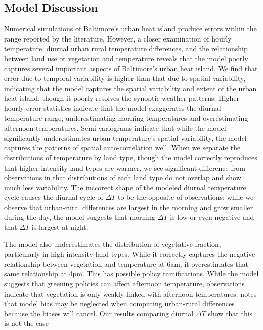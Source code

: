 \documentclass[draft,linenumbers]{agujournal}
\begin{document}
\subsection{Model Discussion}
Numerical simulations of Baltimore's urban heat island produce errors within the range reported by the literature. However, a closer examination of hourly temperature, diurnal urban rural temperature differences, and the relationship between land use or vegetation and temperature reveals that the model poorly captures several important aspects of Baltimore's urban heat island. 
We find that error due to temporal variability is higher than that due to spatial variability, indicating that the model captures the spatial variability and extent of the urban heat island, though it poorly resolves the synoptic weather patterns. Higher hourly error statistics indicate that the model exaggerates the diurnal temperature range, underestimating morning temperatures and overestimating afternoon temperatures. 
 Semi-variograms indicate that while the model significantly underestimates urban temperature's spatial variability, the model captures the patterns of spatial auto-correlation well. When we separate the distributions of temperature by land type, though the model correctly reproduces that higher intensity land types are warmer, we see significant difference from observations in that distributions of each land type do not overlap and show much less variability. 
 The  inccorect shape of the modeled diurnal temperature cycle causes the diurnal cycle of $\Delta T$ to be the opposite of observations: while we observe that urban-rural differences are largest in the morning and grow smaller during the day, the model suggests that morning $\Delta T$ is low or even negative and that $\Delta T$ is largest at night. 

The model also underestimates the distribution of vegetative fraction, particularly in high intensity land types. While it correctly captures the negative relationship between vegetation and temperature at 6am, it overestimates that same relationship at 4pm. This has possible policy ramifications. While the model suggests that greening policies can affect afternoon temperature, observations indicate that vegetation is only weakly linked with afternoon temperatures.
% 
\cite{lisynergistic2003} notes that model bias may be neglected when computing urban-rural differences because the biases will cancel. Our results comparing diurnal $\Delta T$  show that this is not the case
\end{document}
